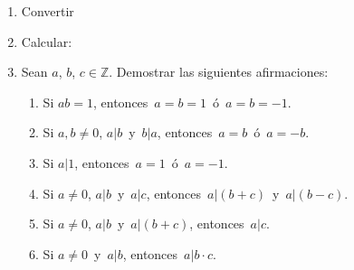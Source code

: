 \documentclass[a4paper,12pt,twoside,spanish,reqno]{amsbook}
\numberwithin{equation}{section}
\begin{document}
\begin{enumerate}
\item Convertir

\item Calcular:


\item Sean $a$, $b$, $c \in {\mathbb Z}$. Demostrar las siguientes afirmaciones:
  \begin{enumerate}
  \item Si $ab=1$, entonces \,$a=b=1$\, ó \,$a=b=-1$.
  \item Si $a,b \neq 0$,  $a| b$\, y \,$b | a$, entonces \,$a=b$\, ó \,$a=-b$.
  \item Si $a | 1$, entonces \,$a=1$\, ó \,$a=-1$.
  \item Si $a \neq 0$, $a | b$\, y \,$a | c$, entonces \,$a | (b+c)$\, y \,$a | (b-c)$.
  \item Si $a \neq 0$, $a | b$\, y \,$a | (b+c)$, entonces \,$a | c$.
  \item Si $a \neq 0$\, y \,$a | b$, entonces \,$a| b\cdot c$.
  \end{enumerate}



\end{enumerate}
\end{document}
